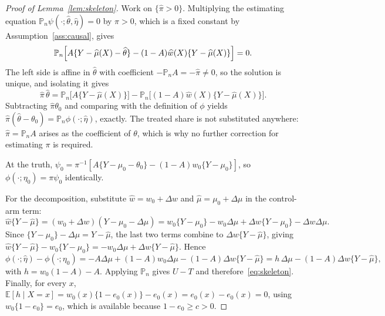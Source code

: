 \documentclass[11pt]{article}
\theoremstyle{plain}
\theoremstyle{definition}
\theoremstyle{remark}
\newcommand{\E}{\mathbb{E}}
\newcommand{\Pn}{\mathbb{P}_n}
\newcommand{\ez}{e_0}
\newcommand{\mz}{\mu_0}
\newcommand{\wz}{w_0}
\newcommand{\mhat}{\widehat{\mu}}
\newcommand{\what}{\widehat{w}}
\newcommand{\thetahat}{\widehat{\theta}}
\newcommand{\pihat}{\widehat{\pi}}
\begin{document}
\begin{proof}[Proof of Lemma~\ref{lem:skeleton}]
Work on $\{\pihat>0\}$. Multiplying the estimating equation
$\Pn\psi(\cdot;\thetahat,\widehat\eta)=0$ by $\pi>0$, which is a fixed constant
by Assumption~\ref{ass:causal}, gives
\[
  \Pn\Bigl[A\{Y-\mhat(X)-\thetahat\}
   -(1-A)\what(X)\{Y-\mhat(X)\}\Bigr]=0 .
\]
The left side is affine in $\thetahat$ with coefficient $-\Pn A=-\pihat\ne0$, so
the solution is unique, and isolating it gives
\[
  \pihat\,\thetahat=\Pn\bigl[A\{Y-\mhat(X)\}\bigr]
   -\Pn\bigl[(1-A)\what(X)\{Y-\mhat(X)\}\bigr].
\]
Subtracting $\pihat\theta_0$ and comparing with the definition of $\phi$ yields
$\pihat(\thetahat-\theta_0)=\Pn\phi(\cdot;\widehat\eta)$, exactly. The treated
share is not substituted anywhere: $\pihat=\Pn A$ arises as the coefficient of
$\theta$, which is why no further correction for estimating $\pi$ is required.

At the truth, $\psi_0=\pi^{-1}[A\{Y-\mz-\theta_0\}-(1-A)\wz\{Y-\mz\}]$, so
$\phi(\cdot;\eta_0)=\pi\psi_0$ identically.

For the decomposition, substitute $\what=\wz+\Delta w$ and
$\mhat=\mz+\Delta\mu$ in the control-arm term:
\[
  \what\{Y-\mhat\}
  =(\wz+\Delta w)(Y-\mz-\Delta\mu)
  =\wz\{Y-\mz\}-\wz\Delta\mu+\Delta w\{Y-\mz\}-\Delta w\Delta\mu .
\]
Since $\{Y-\mz\}-\Delta\mu=Y-\mhat$, the last two terms combine to
$\Delta w\{Y-\mhat\}$, giving
$\what\{Y-\mhat\}-\wz\{Y-\mz\}=-\wz\Delta\mu+\Delta w\{Y-\mhat\}$. Hence
\[
  \phi(\cdot;\widehat\eta)-\phi(\cdot;\eta_0)
  =-A\Delta\mu+(1-A)\wz\Delta\mu-(1-A)\Delta w\{Y-\mhat\}
  =h\,\Delta\mu-(1-A)\Delta w\{Y-\mhat\},
\]
with $h=\wz(1-A)-A$. Applying $\Pn$ gives $U-T$ and
therefore~\eqref{eq:skeleton}. Finally, for every $x$,
$\E[h\mid X=x]=\wz(x)\{1-\ez(x)\}-\ez(x)=\ez(x)-\ez(x)=0$, using
$\wz\{1-\ez\}=\ez$, which is available because $1-\ez\ge c>0$.
\end{proof}
\end{document}
